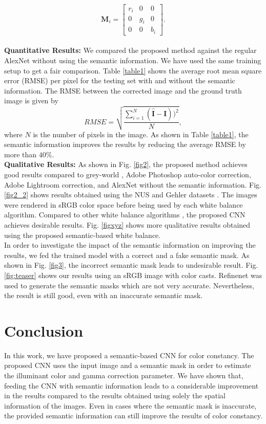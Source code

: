 \documentclass[sigplan]{acmart}
\begin{document}
\begin{equation}
\mathbf{M}_i = \begin{bmatrix}
r_i & 0 & 0\\ 
0 & g_i & 0\\ 
0 & 0 & b_i
\end{bmatrix}.
\end{equation}
\\
\textbf{Quantitative Results:} We compared the proposed method against the regular AlexNet without using the semantic information. We have used the same training setup to get a fair comparison. Table \ref{table1} shows the average root mean square error (RMSE) per pixel for the testing set with and without the semantic information. The RMSE between the corrected image and the ground truth image is given by
\begin{equation}
RMSE = \sqrt{\frac{\sum_{i=1}^{N}(\hat{\mathbf{I}}- \mathbf{I}))^2}{N}},
\end{equation} 
where $N$ is the number of pixels in the image. As shown in Table \ref{table1}, the semantic information improves the results by reducing the average RMSE by more than $40\%$. 
\\
\textbf{Qualitative Results:} As shown in Fig. \ref{fig2}, the proposed method achieves good results compared to grey-world \cite{buchsbaum1980spatial}, Adobe Photoshop auto-color correction, Adobe Lightroom correction, and AlexNet without the semantic information. Fig. \ref{fig2_2} shows results obtained using the NUS and Gehler datasets \cite{nus,gehler2008bayesian}. The images were rendered in sRGB color space before being used by each white balance algorithm. Compared to other white balance algorithms \cite{buchsbaum1980spatial, brainard1986analysis, nus}, the proposed CNN achieves desirable results. Fig. \ref{figxyz} shows more qualitative results obtained using the proposed semantic-based white balance.  
\\
In order to investigate the impact of the semantic information on improving the results, we fed the trained model with a correct and a fake semantic mask. As shown in Fig. \ref{fig3}, the incorrect semantic mask leads to undesirable result. Fig. \ref{fig:teaser} shows our results using an sRGB image with color casts. Refinenet \cite{refnet} was used to generate the semantic masks which are not very accurate. Nevertheless, the result is still good, even with an inaccurate semantic mask.


\section{Conclusion}
In this work, we have proposed a semantic-based CNN for color constancy. The proposed CNN uses the input image and a semantic mask in order to estimate the illuminant color and gamma correction parameter. We have shown that, feeding the CNN with semantic information leads to a considerable improvement in the results compared to the results obtained using solely the spatial information of the images. Even in cases where the semantic mask is inaccurate, the provided semantic information can still improve the results of color constancy. 
\end{document}
